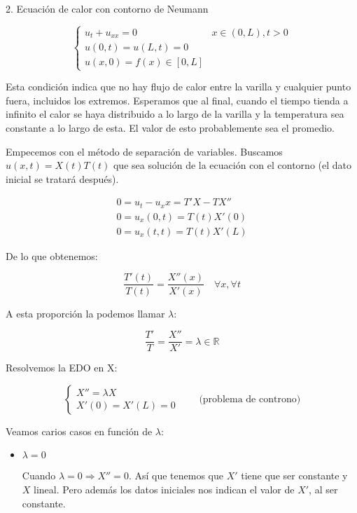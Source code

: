 	\begin{example}{2. Ecuación de calor con contorno de Neumann}

		\[
		\begin{cases}
		u_t + u_{xx} = 0 & x \in (0,L), t > 0 \\
		u(0,t) = u(L,t) = 0 \\
		u(x,0) = f(x) \in [0,L]
		\end{cases}
		\]

		Esta condición indica que no hay flujo de calor entre la varilla y cualquier punto fuera, incluidos los extremos. Esperamos que al final, cuando el tiempo tienda a infinito el calor se haya distribuido a lo largo de la varilla y la temperatura sea constante a lo largo de esta. El valor de esto probablemente sea el promedio.

		Empecemos con el método de separación de variables. Buscamos $u(x,t) = X(t) T(t)$ que sea solución de la ecuación con el contorno (el dato inicial se tratará después).


		\[
		\begin{array}{l}
			0 = u_t - u_xx = T' X - T X'' \\
			0 = u_x (0,t) = T(t) X'(0) \\
			0 = u_x (t,t) = T(t) X'(L)
		\end{array}
		\]

		De lo que obtenemos:

		\[ \frac{T'(t)}{T(t)} = \frac{X''(x)}{X'(x)} \quad \forall x, \forall t \]

		A esta proporción la podemos llamar $\lambda$:

		\[ \frac{T'}{T} = \frac{X''}{X'} = \lambda \in \mathbb{R} \]

		Resolvemos la EDO en X:

		\[
		\left\{ \begin{array}{l}
		X'' = \lambda X \\
		X'(0) = X'(L) = 0
		\end{array} \right. \quad\quad \text{(problema de controno)}
		\]

		Veamos carios casos en función de $\lambda$:

		\begin{itemize}
			\item $\lambda = 0$

				Cuando $\lambda = 0 \Rightarrow X'' = 0$. Así que tenemos que $X'$ tiene que ser constante y $X$ lineal. Pero además los datos iniciales nos indican el valor de $X'$, al ser constante.


\end{itemize}
\end{example}
